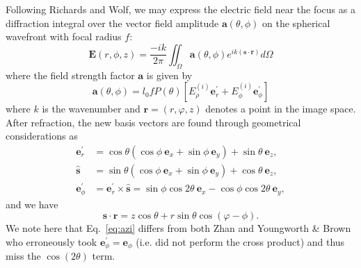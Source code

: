 \documentclass[12pt,a4paper]{article}
\begin{document}
Following Richards and Wolf, we may express the electric field near the focus as a diffraction integral over the vector field amplitude \(\mathbf{a}\!\left(\theta,\phi\right)\) on the spherical wavefront with focal radius \(f\):
\begin{equation}
	\label{eq:rw}
	\mathbf{E}\!\left(r,\phi,z\right) = \frac{-ik}{2\pi} \iint_\Omega \mathbf{a}\!\left(\theta,\phi\right) e^{ik\left(\mathbf{s}\cdot\mathbf{r}\right)}d\Omega
\end{equation}
where the field strength factor \(\mathbf{a}\) is given by
\begin{equation}
	\label{eq:strfct}
	\mathbf{a}\!\left(\theta,\phi\right) = l_{0}fP\!\left(\theta\right)\left[E_{\rho}^{(i)}\mathbf{e}_{r}^{\prime} + E_{\phi}^{(i)}\mathbf{e}_{\phi}^{\prime}\right]
\end{equation}
where \(k\) is the wavenumber and \(\mathbf{r}=\!\left(r,\varphi,z\right)\) denotes a point in the image space. After refraction, the new basis vectors are found through geometrical considerations as
\begin{align}
	\mathbf{e}_{r}^{\prime} &= \cos{\theta}\left(\cos{\phi}\:\mathbf{e}_{x} +\sin{\phi}\:\mathbf{e}_{y}\right) + \sin{\theta}\:\mathbf{e}_{z}, \\
	\hat{\mathbf{s}} &= \sin{\theta}\left(\cos{\phi}\:\mathbf{e}_{x} + \sin{\phi}\:\mathbf{e}_{y}\right) + \cos{\theta}\:\mathbf{e}_{z}, \\
	\label{eq:azi}
	\mathbf{e}_{\phi}^{\prime} &= \mathbf{e}_{r}^{\prime} \times \hat{\mathbf{s}} = \sin{\phi}\cos{2\theta}\:\mathbf{e}_{x} - \cos{\phi}\cos{2\theta}\:\mathbf{e}_{y},
\end{align}
and we have
\begin{equation}
	\label{eq:exponent}
	\mathbf{s}\cdot\mathbf{r} = z\cos{\theta}+r\sin{\theta}\cos{\left(\varphi - \phi\right)}.
\end{equation}
We note here that Eq.~\eqref{eq:azi} differs from both Zhan and Youngworth \& Brown who erroneously took \(\textbf{e}_{\phi}^{\prime} = \textbf{e}_{\phi}\) (i.e. did not perform the cross product) and thus miss the \(\cos{\left(2\theta\right)}\) term.
\end{document}
